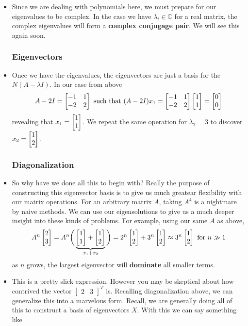 \documentclass[11pt]{article}
\begin{document}
\begin{itemize}
	\item Since we are dealing with polynomials here, we must prepare for our eigenvalues to be complex. In the case we have $\lambda_{i} \in \mathbb{C}$ for a real matrix, the complex eigenvalues will form a \textbf{complex conjugage pair}. We will see this again soon.
\subsubsection*{Eigenvectors}
    \item Once we have the eigenvalues, the eigenvectors are just a basis for the $N(A - \lambda I)$. In our case from above
		\begin{align*}
			A - 2I = \begin{bmatrix} -1 & 1 \\ -2 & 2 \end{bmatrix} \text{ such that } (A - 2I)x_{1} = \begin{bmatrix} -1 & 1 \\ -2 & 2 \end{bmatrix} \begin{bmatrix} 1 \\ 1 \end{bmatrix} = \begin{bmatrix} 0 \\ 0 \end{bmatrix}
		\end{align*}
		revealing that $x_{1} = \begin{bmatrix} 1 \\ 1 \end{bmatrix}$. We repeat the same operation for $\lambda_{2} = 3$ to discover $x_{2} = \begin{bmatrix} 1 \\ 2 \end{bmatrix}$.

\subsubsection*{Diagonalization}
\item So why have we done all this to begin with? Really the purpose of constructing this eigenvector basis is to give us much greatear flexibility with our matrix operations. For an arbitrary matrix $A$, taking $A^{4}$ is a nightmare by naive methods. We can use our eigensolutions to give us a much deeper insight into these kinds of problems. For example, using our same $A$ as above,
	$$A^{n}\begin{bmatrix} 2 \\ 3 \end{bmatrix} = A^{n} \bigg(\underbrace{\begin{bmatrix} 1 \\ 1 \end{bmatrix} + \begin{bmatrix} 1 \\ 2 \end{bmatrix}}_{x_{1}+x_{2}}\bigg) = 2^{n} \begin{bmatrix} 1 \\ 2 \end{bmatrix} + 3^{n} \begin{bmatrix} 1 \\ 2 \end{bmatrix} \approx 3^{n} \begin{bmatrix} 1 \\ 2 \end{bmatrix} \text{ for } n \gg 1$$
	as $n$ grows, the largest eigenvector will \textbf{dominate} all smaller terms.
\item This is a pretty slick expression. However you may be skeptical about how contrived the vector $\begin{bmatrix}
  2 & 3
\end{bmatrix}^{T}$ is. Recalling diagonalization above, we can generalize this into a marvelous form. Recall, we are generally doing all of this to construct a basis of eigenvectors $X$. With this we can say something like


\end{itemize}
\end{document}
